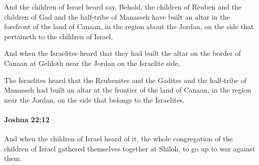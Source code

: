 			\begin{versebox}
					\item[BHS] 
					\item[ASV] And the children of Israel heard say, Behold, the children of Reuben and the children of Gad and the half-tribe of Manasseh have built an altar in the forefront of the land of Canaan, in the region about the Jordan, on the side that pertaineth to the children of Israel.
					\item[NIV] And when the Israelites heard that they had built the altar on the border of Canaan at Geliloth near the Jordan on the Israelite side,
					\item[NRSV] The Israelites heard that the Reubenites and the Gadites and the half-tribe of Manasseh had built an altar at the frontier of the land of Canaan, in the region near the Jordan, on the side that belongs to the Israelites.
			\end{versebox}

		\paragraph{Joshua 22:12} %
			\label{JOSHUA-22-12}

			And when the children of Israel heard of it, the whole congregation of the children of Israel gathered themselves together at Shiloh, to go up to war against them.

